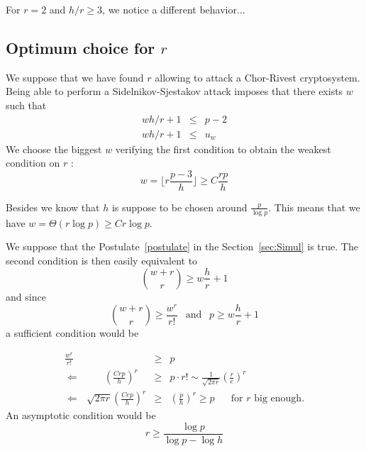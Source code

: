 \documentclass[a4paper]{article}
\begin{document}
For $r = 2$ and $h/r \geq 3$, we notice a different behavior...


\subsection{Optimum choice for $r$}

We suppose that we have found $r$ allowing to attack a Chor-Rivest cryptosystem. Being able to perform a Sidelnikov-Sjestakov attack imposes that there exists $w$ such that
\begin{eqnarray*}
wh/r+1 &\leq & p-2 \\
wh/r+1 &\leq & u_w 
\end{eqnarray*}
We choose the biggest $w$ verifying the first condition to obtain the weakest condition on $r$ : $$ w = \lfloor r \frac{p-3}{h} \rfloor \geq C \frac{rp}{h} $$



Besides we know that $h$ is suppose to be chosen around $\frac{p}{\log p}$. This means that we have $w = \Theta(r \log p) \geq C r \log p$.

We suppose that the Postulate~\ref{postulate} in the Section~\ref{sec:Simul} is true. The second condition is then easily equivalent to
$$ \binom{w+r}{r} \geq w\frac{h}{r}+1 $$
and since
$$ \binom{w+r}{r} \geq \frac{w^r}{r!} \ \ \text{ and } \ \ p \geq w\frac{h}{r}+1 $$
a sufficient condition would be




\begin{eqnarray*}
\frac{w^r}{r!} &\geq& p \\
\Leftarrow \ \ \ \ \ \ \ \ \ \ \ \left(\frac{Crp}{h}\right)^r  &\geq& p \cdot r! \sim \frac{1}{\sqrt{2\pi r}} \left(\frac{r}{e}\right)^r \\
\Leftarrow \ \ \ \sqrt{2\pi r} \left(\frac{Cep}{h}\right)^r &\geq& \left(\frac{p}{h}\right)^r \geq p \ \ \ \ \ \ \text{ for $r$ big enough.}
\end{eqnarray*}
An asymptotic condition would be
$$ r \geq \frac{\log p}{\log p - \log h}$$
\end{document}
